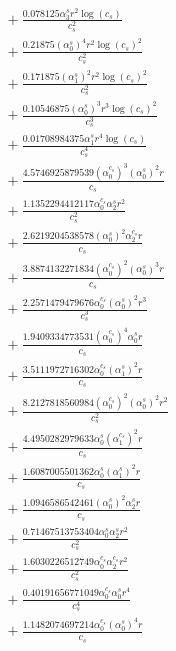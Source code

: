 \documentclass[10pt]{article}
\begin{document}
\begin{align*}
&{}  + \frac{0.078125 \alpha_{3}^s r^{2} \log{\left(c_{s} \right)}}{c_{s}^{2}} \\
&{}  + \frac{0.21875 \left(\alpha_{0}^s\right)^{4} r^{2} \log{\left(c_{s} \right)}^{2}}{c_{s}^{2}} \\
&{}  + \frac{0.171875 \left(\alpha_{1}^s\right)^{2} r^{2} \log{\left(c_{s} \right)}^{2}}{c_{s}^{2}} \\
&{}  + \frac{0.10546875 \left(\alpha_{0}^s\right)^{3} r^{3} \log{\left(c_{s} \right)}^{2}}{c_{s}^{3}} \\
&{}  + \frac{0.01708984375 \alpha_{1}^s r^{4} \log{\left(c_{s} \right)}}{c_{s}^{4}} \\
&{}  + \frac{4.5746925879539 \left(\alpha_{0}^{c_s}\right)^{3} \left(\alpha_{0}^s\right)^{2} r}{c_{s}} \\
&{}  + \frac{1.1352294412117 \alpha_{0}^{c_s} \alpha_{2}^s r^{2}}{c_{s}^{2}} \\
&{}  + \frac{2.6219204538578 \left(\alpha_{0}^s\right)^{2} \alpha_{2}^{c_s} r}{c_{s}} \\
&{}  + \frac{3.8874132271834 \left(\alpha_{0}^{c_s}\right)^{2} \left(\alpha_{0}^s\right)^{3} r}{c_{s}} \\
&{}  + \frac{2.2571479479676 \alpha_{0}^{c_s} \left(\alpha_{0}^s\right)^{2} r^{3}}{c_{s}^{3}} \\
&{}  + \frac{1.9409334773531 \left(\alpha_{0}^{c_s}\right)^{4} \alpha_{0}^s r}{c_{s}} \\
&{}  + \frac{3.5111972716302 \alpha_{0}^{c_s} \left(\alpha_{1}^s\right)^{2} r}{c_{s}} \\
&{}  + \frac{8.2127818560984 \left(\alpha_{0}^{c_s}\right)^{2} \left(\alpha_{0}^s\right)^{2} r^{2}}{c_{s}^{2}} \\
&{}  + \frac{4.4950282979633 \alpha_{0}^s \left(\alpha_{1}^{c_s}\right)^{2} r}{c_{s}} \\
&{}  + \frac{1.6087005501362 \alpha_{0}^s \left(\alpha_{1}^s\right)^{2} r}{c_{s}} \\
&{}  + \frac{1.0946586542461 \left(\alpha_{0}^s\right)^{2} \alpha_{2}^s r}{c_{s}} \\
&{}  + \frac{0.71467513753404 \alpha_{0}^s \alpha_{2}^s r^{2}}{c_{s}^{2}} \\
&{}  + \frac{1.6030226512749 \alpha_{0}^{c_s} \alpha_{2}^{c_s} r^{2}}{c_{s}^{2}} \\
&{}  + \frac{0.40191656771049 \alpha_{0}^{c_s} \alpha_{0}^s r^{4}}{c_{s}^{4}} \\
&{}  + \frac{1.1482074697214 \alpha_{0}^{c_s} \left(\alpha_{0}^s\right)^{4} r}{c_{s}} \\

\end{align*}
\end{document}
